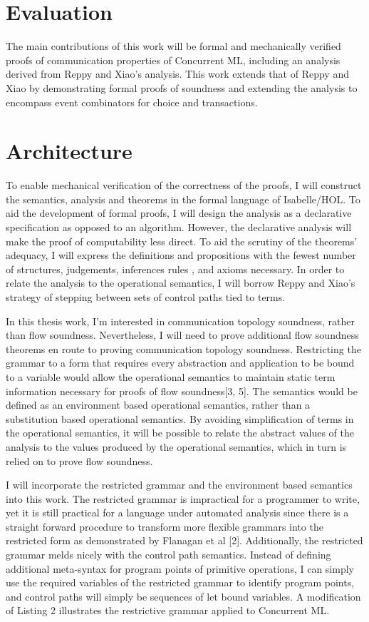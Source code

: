 \documentclass{article}
\begin{document}
\section{Evaluation}
The main contributions of this work will be formal and mechanically verified proofs of
communication properties of Concurrent ML, including an analysis derived from Reppy and Xiao's
analysis.  This work extends that of Reppy and Xiao by demonstrating formal proofs of soundness
and extending the analysis to encompass event combinators for choice and transactions.


\section{Architecture}
To enable mechanical verification of the correctness of the proofs, I will construct the
semantics, analysis and theorems in the formal language of Isabelle/HOL.  To aid the
development of formal proofs, I will design the analysis as a declarative specification as
opposed to an algorithm.  However, the declarative analysis will make the proof of
computability less direct.  To aid the scrutiny of the theorems' adequacy, I will express the
definitions and propositions with the fewest number of structures, judgements, inferences rules
, and axioms necessary. In order to relate the analysis to the operational semantics, I will
borrow Reppy and Xiao's strategy of stepping between sets of control paths tied to terms.

In this thesis work, I'm interested in communication topology soundness, rather than flow
soundness.  Nevertheless, I will need to prove additional flow soundness theorems en route to
proving communication topology soundness.  Restricting the grammar to a form that requires
every abstraction and application to be bound to a variable would allow the operational
semantics to maintain static term information necessary for proofs of flow soundness[3, 5].
The semantics would be defined as an environment based operational semantics, rather than a
substitution based operational semantics.  By avoiding simplification of terms in the
operational semantics, it will be possible to relate the abstract values of the analysis to the
values produced by the operational semantics, which in turn is relied on to prove flow
soundness.


I will incorporate the restricted grammar and the environment based semantics into this work.
The restricted grammar is impractical for a programmer to write, yet it is still practical for
a language under automated analysis since there is a straight forward procedure to transform
more flexible grammars into the restricted form as demonstrated by Flanagan et al [2].
Additionally, the restricted grammar melds nicely with the control path semantics.  Instead of
defining additional meta-syntax for program points of primitive operations, I can simply use
the required variables of the restricted grammar to identify program points, and control paths
will simply be sequences of let bound variables. A modification of Listing 2 illustrates the
restrictive grammar applied to Concurrent ML.
\end{document}
